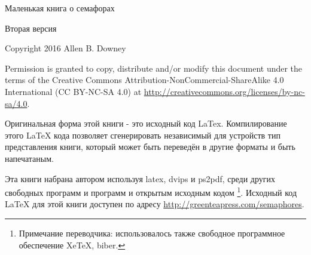 \vspace{2in}
\begin{center}
{\Large Маленькая книга о семафорах}

Вторая версия
\vspace{0.25in}

\theversion
\vspace{0.25in}

Copyright 2016 Allen B. Downey
\end{center}
\vspace{0.25in}

Permission is granted to copy, distribute and/or modify this
document under the terms of the Creative Commons
Attribution-NonCommercial-ShareAlike 4.0 International (CC BY-NC-SA 4.0)
at \url{http://creativecommons.org/licenses/by-nc-sa/4.0}.

Оригинальная форма этой книги - это исходный код LaTex.
Компилирование этого LaTeX кода позволяет сгенерировать
независимый для устройств тип представления книги, который может быть
переведён в другие форматы и быть напечатаным.

Эта книги набрана автором используя latex, dvips и ps2pdf, среди других
свободных программ и программ и открытым исходным кодом
\footnote{Примечание переводчика: использовалось также свободное программное 
обеспечение XeTeX, biber.}.
Исходный код LaTeX для этой книги доступен по адресу
\url{http://greenteapress.com/semaphores}.

\frontmatter
